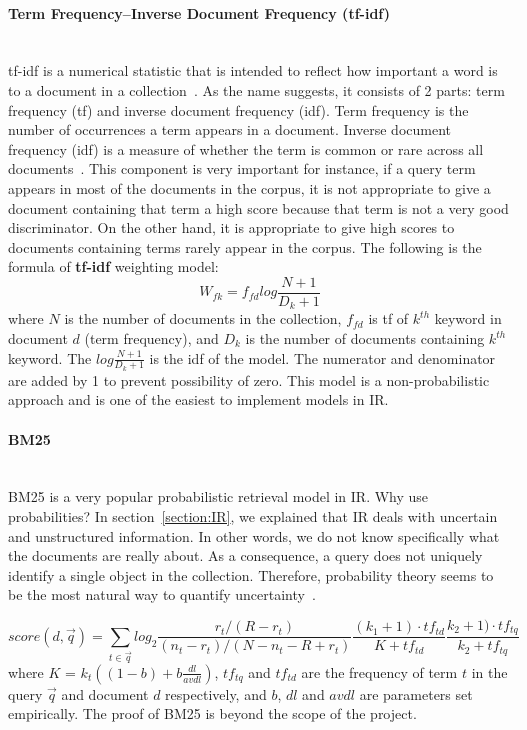 \paragraph{Term Frequency–Inverse Document Frequency (tf-idf)} \hspace{0pt} \\
\indent tf-idf is a numerical statistic that is intended to reflect how important a word is to a document in a collection~\cite{tfidf}. As the name suggests, it consists
of 2 parts: term frequency (tf) and inverse document frequency (idf). Term frequency is the number of occurrences a term appears in a document.
Inverse document frequency (idf) is a measure of whether the term is common or rare across all documents~\cite{tfidf}.
This component is very important for instance, if a query term appears in most of the documents in the corpus, it is not appropriate to give a 
document containing that term a high score because that term is not a very good discriminator. On the other hand, it is appropriate to give high scores to 
documents containing terms rarely appear in the corpus.
The following is the formula of \textbf{tf-idf} weighting model:
\begin{equation}
W_{fk} = f_{fd}log \frac{N + 1}{D_k + 1}
\end{equation}
where $N$ is the number of documents in the collection, $f_{fd}$ is tf of ${k^{th}}$ keyword in document $d$ (term frequency),
and $D_k$ is the number of documents containing ${k^{th}}$ keyword. The $log \frac{N + 1}{D_k + 1}$ is the idf of the model.
The numerator and denominator are added by 1 to prevent possibility of zero.
This model is a non-probabilistic approach and is one of the easiest to implement models in IR.

\paragraph{BM25} \hspace{0pt} \\
BM25 is a very popular probabilistic retrieval model in IR. Why use probabilities? 
In section~\ref{section:IR}, we explained that IR deals with uncertain and unstructured information. In other words, we do not know specifically
what the documents are really about. As a consequence, a query does not uniquely identify a single object in the collection. Therefore, probability theory
seems to be the most natural way to quantify uncertainty~\cite[P. 7]{probModel}.

\begin{equation}\label{eq:BM25}
score(d, \vec{q}) = \sum_{t \in \vec{q}} log_2 \frac{r_t/(R - r_t)}{(n_t - r_t)/(N - n_t - R + r_t)} \frac{(k_1 + 1)\cdot tf_{td}}{K + tf_{td}} \frac{k_2 + 1)\cdot tf_{tq}}{k_2 + tf_{tq}}
\end{equation}
where $K$ = $k_t((1 - b) + b\frac{dl}{avdl})$, $tf_{tq}$ and $tf_{td}$ are the frequency of term $t$ in the query $\vec{q}$ and document $d$ respectively,
and $b$, $dl$ and $avdl$ are parameters set empirically. The proof of BM25 is beyond the scope of the project.

